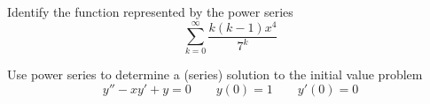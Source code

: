 \documentclass[]{ximera}
\begin{document}
\begin{instructorNotes}

\end{instructorNotes}







\begin{problem}
Identify the function represented by the power series
	\[
	\sum_{k=0}^\infty \frac{k(k-1)x^4}{7^k}
	\]
	
	\begin{freeResponse}
	
	\end{freeResponse}

\end{problem}

\begin{instructorNotes}

\end{instructorNotes}







\begin{problem}
Use power series to determine a (series) solution to the initial value problem
	\[
	y'' - xy' + y = 0 	\qquad	y(0) = 1 	\qquad	y'(0) = 0
	\]
	
	\begin{freeResponse}
	
	\end{freeResponse}

\end{problem}

\begin{instructorNotes}

\end{instructorNotes}
















	
	
	
	
	
	
	
	
	

	










								
				
				
	
\end{document}

